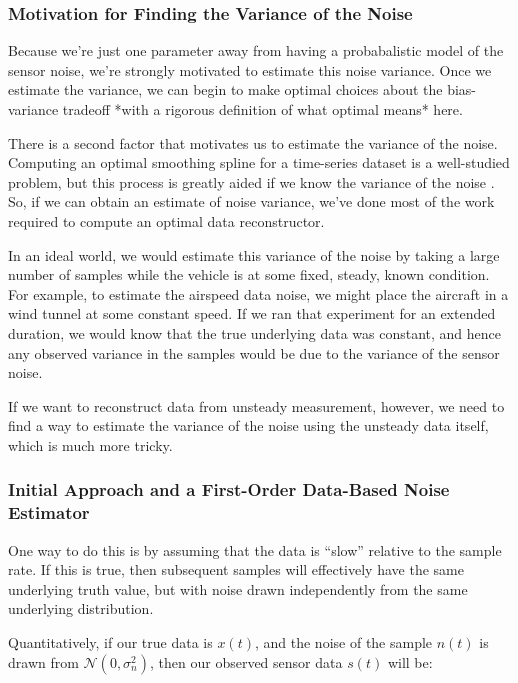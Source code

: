 \documentclass[conf]{new-aiaa}
\begin{document}
    \subsubsection{Motivation for Finding the Variance of the Noise}

    Because we're just one parameter away from having a probabalistic model of the sensor noise, we're strongly motivated to estimate this noise variance. Once we estimate the variance, we can begin to make optimal choices about the bias-variance tradeoff *with a rigorous definition of what optimal means* here.

    There is a second factor that motivates us to estimate the variance of the noise. Computing an optimal smoothing spline for a time-series dataset is a well-studied problem, but this process is greatly aided if we know the variance of the noise \cite{wahba}. So, if we can obtain an estimate of noise variance, we've done most of the work required to compute an optimal data reconstructor.

    In an ideal world, we would estimate this variance of the noise by taking a large number of samples while the vehicle is at some fixed, steady, known condition. For example, to estimate the airspeed data noise, we might place the aircraft in a wind tunnel at some constant speed. If we ran that experiment for an extended duration, we would know that the true underlying data was constant, and hence any observed variance in the samples would be due to the variance of the sensor noise.

    If we want to reconstruct data from unsteady measurement, however, we need to find a way to estimate the variance of the noise using the unsteady data itself, which is much more tricky.

    \subsubsection{Initial Approach and a First-Order Data-Based Noise Estimator}

    One way to do this is by assuming that the data is ``slow'' relative to the sample rate. If this is true, then subsequent samples will effectively have the same underlying truth value, but with noise drawn independently from the same underlying distribution.

    Quantitatively, if our true data is $x(t)$, and the noise of the sample $n(t)$ is drawn from $\mathcal{N}(0, \sigma^2_n)$, then our observed sensor data $s(t)$ will be:
\end{document}
